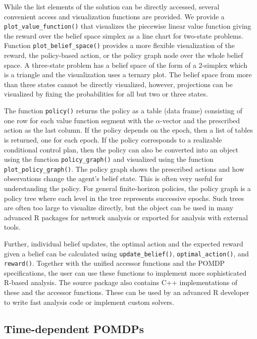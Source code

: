 While the list elements of the solution can be directly accessed, several convenient access and visualization functions are provided.
We provide a \texttt{plot\_value\_function()} that visualizes the piecewise linear value function giving the reward over the belief space simplex as a line chart for two-state problems. Function \texttt{plot\_belief\_space()}
provides a more flexible visualization of the reward, the policy-based action, or the policy graph node
over the whole belief space. A three-state problem has a belief space of the form of a 2-simplex which is a triangle
and the visualization uses a ternary plot.
The belief space from more than three states cannot be directly visualized, however, projections
can be visualized by fixing the probabilities for all but two or three states.

The function \texttt{policy()} returns the policy as a table (data frame) consisting of
one row for each value function segment with the \(\alpha\)-vector and the prescribed action as the last column.
If the policy depends on the epoch, then a list of tables is returned, one for
each epoch.
If the policy corresponds to a realizable conditional control plan, then
the policy can also be converted into an  object using the function
\texttt{policy\_graph()} and visualized using the function \texttt{plot\_policy\_graph()}.
The policy graph shows the prescribed actions and how observations change the agent's belief state.
This is often very useful for understanding the
policy. For general finite-horizon policies, the policy graph is a
policy tree where each level in the tree represents successive epochs.
Such trees are often too large to visualize directly, but the  object
can be used in many advanced R packages for network analysis or exported for analysis with
external tools.

Further,
individual belief updates, the optimal action and the expected reward given a belief can be calculated using
\texttt{update\_belief()},
\texttt{optimal\_action()}, and
\texttt{reward()}. Together with the unified accessor functions and the POMDP specifications,
the user can use these functions
to implement more sophisticated R-based analysis.
The source package also contains C++ implementations of these and the accessor functions. These can be used by an advanced
R developer to write fast analysis code or implement custom solvers.

\hypertarget{time-dependent-pomdps}{%
\subsection{Time-dependent POMDPs}\label{time-dependent-pomdps}}


